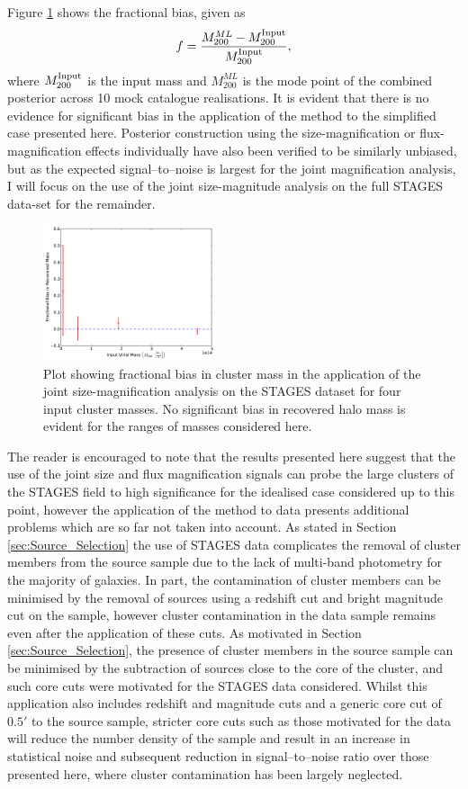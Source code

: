 \documentclass[useAMS,usenatbib,times,letter,amssymb]{mn2e}
\def\be{\begin{equation}}
\def\ee{\end{equation}}
\begin{document}
Figure \ref{fig:Analysis_Bias_STAGES_SizeMag} shows the fractional bias, given as
\be
f = \frac{M^{ML}_{200}-M^{\rm Input}_{200}}{M^{\rm Input}_{200}},
\ee
where $M^{\rm Input}_{200}$ is the input mass and $M^{ML}_{200}$ is the mode point of the combined posterior across 10 mock catalogue realisations. It is evident that there is no evidence for significant bias in the application of the method to the simplified case presented here. Posterior construction using the size-magnification or flux-magnification effects individually have also been verified to be similarly unbiased, but as the expected signal--to--noise is largest for the joint magnification analysis, I will focus on the use of the joint size-magnitude analysis on the full STAGES data-set for the remainder.

\begin{figure}
\centering
\includegraphics[width = 0.45\textwidth]{Figures/Mock_Application/SizeMag_Unbiased.pdf}
\caption{Plot showing fractional bias in cluster mass in the application of the joint size-magnification analysis on the STAGES dataset for four input cluster masses. No significant bias in recovered halo mass is evident for the ranges of masses considered here.} \label{fig:Analysis_Bias_STAGES_SizeMag}
\end{figure}

The reader is encouraged to note that the results presented here suggest that the use of the joint size and flux magnification signals can probe the large clusters of the STAGES field to high significance for the idealised case considered up to this point, however the application of the method to data presents additional problems which are so far not taken into account. As stated in Section \ref{sec:Source_Selection} the use of STAGES data complicates the removal of cluster members from the source sample due to the lack of multi-band photometry for the majority of galaxies. In part, the contamination of cluster members can be minimised by the removal of sources using a redshift cut and bright magnitude cut on the sample, however cluster contamination in the data sample remains even after the application of these cuts. As motivated in Section \ref{sec:Source_Selection}, the presence of cluster members in the source sample can be minimised by the subtraction of sources close to the core of the cluster, and such core cuts were motivated for the STAGES data considered. Whilst this application also includes redshift and magnitude cuts and a generic core cut of $0.5'$ to the source sample, stricter core cuts such as those motivated for the data will reduce the number density of the sample and result in an increase in statistical noise and subsequent reduction in signal--to--noise ratio over those presented here, where cluster contamination has been largely neglected. 
\end{document}
